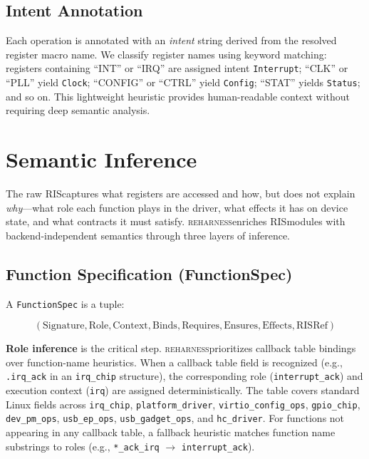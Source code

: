 \documentclass[sigconf,review]{acmart}
\newcommand{\reharness}{\textsc{reharness}}
\newcommand{\rislang}{RIS}
\begin{document}
\subsection{Intent Annotation}

Each operation is annotated with an \emph{intent} string derived from the resolved register macro name. We classify register names using keyword matching: registers containing ``INT'' or ``IRQ'' are assigned intent \texttt{Interrupt}; ``CLK'' or ``PLL'' yield \texttt{Clock}; ``CONFIG'' or ``CTRL'' yield \texttt{Config}; ``STAT'' yields \texttt{Status}; and so on. This lightweight heuristic provides human-readable context without requiring deep semantic analysis.

\section{Semantic Inference}

The raw \rislang captures what registers are accessed and how, but does not explain \emph{why}---what role each function plays in the driver, what effects it has on device state, and what contracts it must satisfy. \reharness enriches \rislang modules with backend-independent semantics through three layers of inference.

\subsection{Function Specification (FunctionSpec)}

A \texttt{FunctionSpec} is a tuple:

\[
(\text{Signature}, \text{Role}, \text{Context}, \text{Binds}, \text{Requires}, \text{Ensures}, \text{Effects}, \text{RISRef})
\]

\textbf{Role inference} is the critical step. \reharness prioritizes callback table bindings over function-name heuristics. When a callback table field is recognized (e.g., \texttt{.irq\_ack} in an \texttt{irq\_chip} structure), the corresponding role (\texttt{interrupt\_ack}) and execution context (\texttt{irq}) are assigned deterministically. The table covers standard Linux fields across \texttt{irq\_chip}, \texttt{platform\_driver}, \texttt{virtio\_config\_ops}, \texttt{gpio\_chip}, \texttt{dev\_pm\_ops}, \texttt{usb\_ep\_ops}, \texttt{usb\_gadget\_ops}, and \texttt{hc\_driver}. For functions not appearing in any callback table, a fallback heuristic matches function name substrings to roles (e.g., \texttt{*\_ack\_irq} $\rightarrow$ \texttt{interrupt\_ack}).
\end{document}

